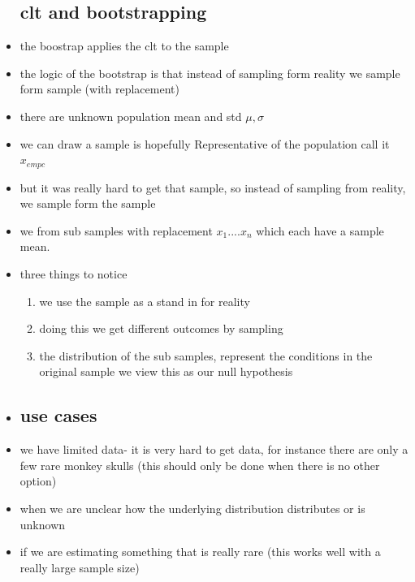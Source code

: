 \documentclass{article}
\begin{document}
\begin{itemize}
\subsection{clt and bootstrapping}
\item the boostrap applies the clt to the sample
\item the logic of the bootstrap is that instead of sampling form reality we sample form sample (with replacement) 
\item there are unknown population mean and std $\mu, \sigma$
\item we can draw a sample is hopefully Representative of the population call it $x_{empc}$ 
\item but it was really hard to get that sample, so instead of sampling from reality, we sample form the sample
\item we from sub samples with replacement $x_1....x_n$ which each have a sample mean. 
\item three things to notice
\begin{enumerate}
    \item we use the sample as a stand in for reality
    \item doing this we get different outcomes by sampling 
    \item the distribution of the sub samples, represent the conditions in the original sample we view this as our null hypothesis
\end{enumerate}
\item
\subsection{use cases}
\item we have limited data- it is very hard to get data, for instance there are only a few rare monkey skulls (this should only be done when there is no other option)
\item when we are unclear how the underlying distribution distributes or is unknown 
\item if we are estimating something that is really rare (this works well with a really large sample size) 


\end{itemize}
\end{document}
